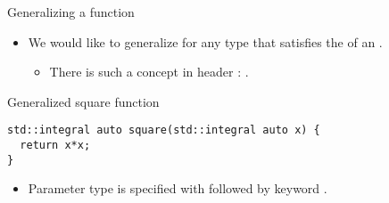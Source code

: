 \begin{frame}[t,fragile]{Generalizing a function}
\begin{itemize}
  \item We would like to generalize for any type that satisfies the
         of an .
    \begin{itemize}
      \item There is such a concept in header : .
    \end{itemize}
\end{itemize}

\begin{block}{Generalized square function}
\begin{lstlisting}
std::integral auto square(std::integral auto x) {
  return x*x;
}
\end{lstlisting}
\end{block}

\begin{itemize}
  \item Parameter type is specified with  
        followed by keyword .


\end{itemize}

\end{frame}

